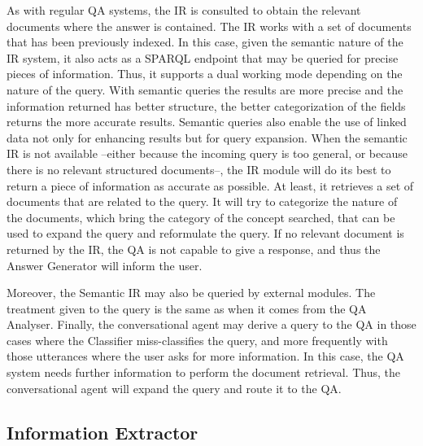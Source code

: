 As with regular \ac{QA} systems, the \ac{IR} is consulted to obtain the relevant documents where the answer is contained. The \ac{IR} works with a set of documents that has been previously indexed.
In this case, given the semantic nature of the \ac{IR} system, it also acts as a SPARQL endpoint that may be queried for precise pieces of information. Thus, it supports a dual working mode depending on the nature of the query. 
With semantic queries the results are more precise and the information returned has better structure, the better categorization of the fields returns the more accurate results. 
Semantic queries also enable the use of linked data not only for enhancing results but for query expansion.
When the semantic \ac{IR} is not available --either because the incoming query is too general, or because there is no relevant structured documents--, the \ac{IR} module will do its best to return a piece of information as accurate as possible. At least, it retrieves a set of documents that are related to the query. It will try to categorize the nature of the documents, which bring the category of the concept searched, that can be used to expand the query and reformulate the query.
If no relevant document is returned by the \ac{IR}, the \ac{QA} is not capable to give a response, and thus the Answer Generator will inform the user. 

Moreover, the Semantic \ac{IR} may also be queried by external modules. The treatment given to the query is the same as when it comes from the QA Analyser.
Finally, the conversational agent may derive a query to the \ac{QA} in those cases where the Classifier miss-classifies the query, and more frequently with those utterances where the user	 asks for more information. In this case, the \ac{QA} system needs further information to perform the document retrieval. Thus, the conversational agent will expand the query and route it to the \ac{QA}.


\subsection{Information Extractor}

